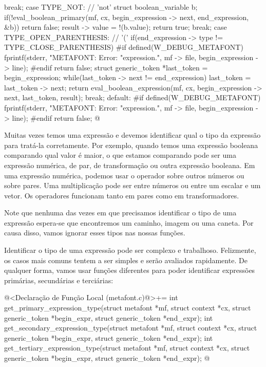 {{{{{{{{    break;
    case TYPE_NOT: // 'not'
      struct boolean_variable b;
      if(!eval_boolean_primary(mf, cx, begin_expression -> next, end_expression,
                              &b))
        return false;
      result -> value = !(b.value);
      return true;
    break;
    case TYPE_OPEN_PARENTHESIS: // '('
      if(end_expression -> type != TYPE_CLOSE_PARENTHESIS){
#if defined(W_DEBUG_METAFONT)
      fprintf(stderr, "METAFONT: Error: %
              "expression.\n",  mf -> file, begin_expression -> line);
#endif
        return false;
      }
      struct generic_token *last_token = begin_expression;
      while(last_token -> next != end_expression)
        last_token = last_token -> next;
      return eval_boolean_expression(mf, cx, begin_expression -> next,
                                     last_token, result);
    break;
    default:
#if defined(W_DEBUG_METAFONT)
      fprintf(stderr, "METAFONT: Error: %
              "expression.\n",  mf -> file, begin_expression -> line);
#endif
    return false;
  }
}
@
\fimcodigo


Muitas vezes temos uma expressão e devemos identificar qual o tipo da
expressão para tratá-la corretamente. Por exemplo, quando temos uma
expressão booleana comparando qual valor é maior, o que estamos
comparando pode ser uma expressão numérica, de par, de transformação
ou outra expressão booleana. Em uma expressão numérica, podemos usar o
operador  sobre outros números ou sobre pares. Uma
multiplicação pode ser entre números ou entre um escalar e um
vetor. Os operadores  funcionam tanto em pares como
em transformadores.

Note que nenhuma das vezes em que precisamos identificar o tipo de uma
expressão espera-se que encontremos um caminho, imagem ou uma caneta. Por
causa disso, vamos ignorar esses tipos nas nossas funções.

Identificar o tipo de uma expressão pode ser complexo e
trabalhoso. Felizmente, os casos mais comuns tentem a ser simples e
serão avaliados rapidamente. De qualquer forma, vamos usar funções
diferentes para poder identificar expressões primárias, secundárias e
terciárias:

\iniciocodigo
@<Declaração de Função Local (metafont.c)@>+=
int get_primary_expression_type(struct metafont *mf, struct context *cx,
                               struct generic_token *begin_expr,
                               struct generic_token *end_expr);
int get_secondary_expression_type(struct metafont *mf, struct context *cx,
                                 struct generic_token *begin_expr,
                                 struct generic_token *end_expr);
int get_tertiary_expression_type(struct metafont *mf, struct context *cx,
                                struct generic_token *begin_expr,
                                struct generic_token *end_expr);
@
\fimcodigo

}}}}}}
